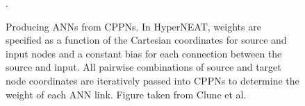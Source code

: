 \begin{figure}
\begin{center}
\vspace{1cm}
\caption [ ]{Producing ANNs from CPPNs. In HyperNEAT, weights are specified as a function of the Cartesian coordinates for source and input nodes and a constant bias for each connection between the source and input. All pairwise combinations of source and target node coordinates are iteratively passed into CPPNs to determine the weight of each ANN link. Figure taken from Clune et al. \cite{clune2}}.
\end{center}
\end{figure}

